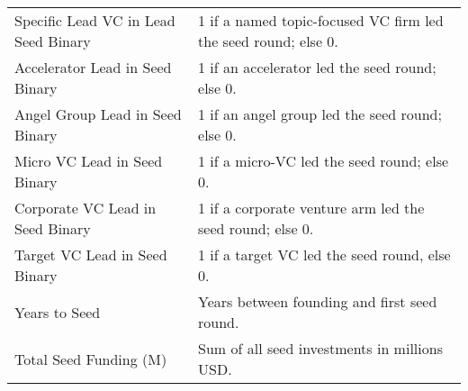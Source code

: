 {\begin{tabular}{p{} p{}}
Specific Lead VC in Lead Seed Binary & 1 if a named topic-focused VC firm led the seed round; else 0. \\[0.4em]
Accelerator Lead in Seed Binary & 1 if an accelerator led the seed round; else 0. \\[0.4em]
Angel Group Lead in Seed Binary & 1 if an angel group led the seed round; else 0. \\[0.4em]
Micro VC Lead in Seed Binary & 1 if a micro-VC led the seed round; else 0. \\[0.4em]
Corporate VC Lead in Seed Binary & 1 if a corporate venture arm led the seed round; else 0. \\[0.4em]
Target VC Lead in Seed Binary & 1 if a target VC led the seed round, else 0. \\[0.4em]
Years to Seed & Years between founding and first seed round. \\[0.4em]
Total Seed Funding (M) & Sum of all seed investments in millions USD. \\[0.4em]
\bottomrule
\end{tabular}
}
